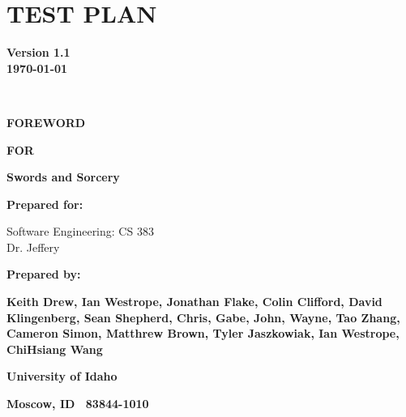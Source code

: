 \chapter{TEST PLAN}


{\centering{}\bfseries\color{black}
Version 1.1\\
\today
\par}

\ 

{\centering{}\bfseries\color{black}
FOREWORD
\par}
\bigskip

{\centering{}\bfseries\color{black}
FOR
\par}


\bigskip

{\centering{}\bfseries\color{black}
Swords and Sorcery
\par}




\begin{figure}
\centering
\end{figure}

\bigskip


\bigskip

{\centering{}\bfseries\color{black}
Prepared for: 
\par
Software Engineering: CS 383\\
Dr. Jeffery
\par}

\bigskip


\bigskip

{\centering{}\bfseries\color{black}
Prepared by:
\par}

{\centering{}\bfseries\color{black}
Keith Drew,
 Ian Westrope,
 Jonathan Flake,
 Colin Clifford,
 David Klingenberg,
 Sean Shepherd,
 Chris,
 Gabe,
 John,
 Wayne, 
 Tao Zhang,
 Cameron Simon,
 Matthrew Brown,
 Tyler Jaszkowiak,
 Ian Westrope,
 ChiHsiang Wang
\par}

\bigskip

{\centering{}\bfseries\color{black}
University of Idaho
\par}

{\centering{}\bfseries\color{black}
Moscow, ID \ 83844-1010
\par}



